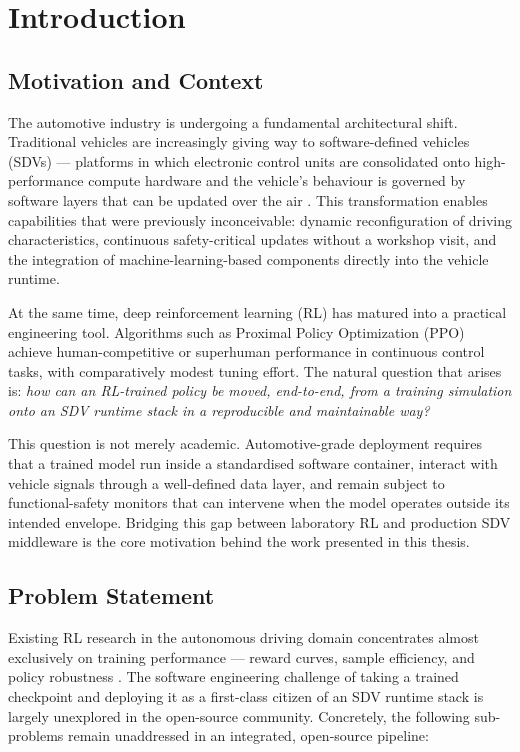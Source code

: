 \chapter{Introduction}\label{ch:introduction}
\thispagestyle{pagestyle}

\section{Motivation and Context}
\label{sec:motivation}

The automotive industry is undergoing a fundamental architectural shift.
Traditional vehicles are increasingly giving way to software-defined vehicles
(SDVs) --- platforms in which electronic control units are consolidated onto
high-performance compute hardware and the vehicle's behaviour is governed by
software layers that can be updated over the air \cite{EclipseLeda2023}. This
transformation enables capabilities that were previously inconceivable: dynamic
reconfiguration of driving characteristics, continuous safety-critical updates
without a workshop visit, and the integration of machine-learning-based
components directly into the vehicle runtime.

At the same time, deep reinforcement learning (RL) has matured into a practical
engineering tool. Algorithms such as Proximal Policy Optimization (PPO)
\cite{Schulman2017} achieve human-competitive or superhuman performance in
continuous control tasks, with comparatively modest tuning effort. The natural
question that arises is: \textit{how can an RL-trained policy be moved,
end-to-end, from a training simulation onto an SDV runtime stack in a
reproducible and maintainable way?}

This question is not merely academic. Automotive-grade deployment requires that
a trained model run inside a standardised software container, interact with
vehicle signals through a well-defined data layer, and remain subject to
functional-safety monitors that can intervene when the model operates outside
its intended envelope. Bridging this gap between laboratory RL and production
SDV middleware is the core motivation behind the work presented in this thesis.

\section{Problem Statement}
\label{sec:problem}

Existing RL research in the autonomous driving domain concentrates almost
exclusively on training performance --- reward curves, sample efficiency, and
policy robustness \cite{Kiran2021}. The software engineering challenge of
taking a trained checkpoint and deploying it as a first-class citizen of an SDV
runtime stack is largely unexplored in the open-source community. Concretely,
the following sub-problems remain unaddressed in an integrated, open-source
pipeline:


